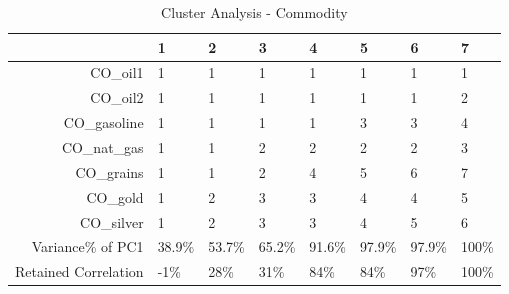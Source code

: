 \begin{longtable}{rlllllll}
\caption{Cluster Analysis - Commodity} \\ 
  \hline
 & 1 & 2 & 3 & 4 & 5 & 6 & 7 \\ 
  \hline
CO\_oil1 & 1 & 1 & 1 & 1 & 1 & 1 & 1 \\ 
  CO\_oil2 & 1 & 1 & 1 & 1 & 1 & 1 & 2 \\ 
  CO\_gasoline & 1 & 1 & 1 & 1 & 3 & 3 & 4 \\ 
  CO\_nat\_gas & 1 & 1 & 2 & 2 & 2 & 2 & 3 \\ 
  CO\_grains & 1 & 1 & 2 & 4 & 5 & 6 & 7 \\ 
  CO\_gold & 1 & 2 & 3 & 3 & 4 & 4 & 5 \\ 
  CO\_silver & 1 & 2 & 3 & 3 & 4 & 5 & 6 \\ 
  Variance\% of PC1 & 38.9\% & 53.7\% & 65.2\% & 91.6\% & 97.9\% & 97.9\% & 100\% \\ 
  Retained Correlation & -1\% & 28\% & 31\% & 84\% & 84\% & 97\% & 100\% \\ 
   \hline
\hline
\end{longtable}
